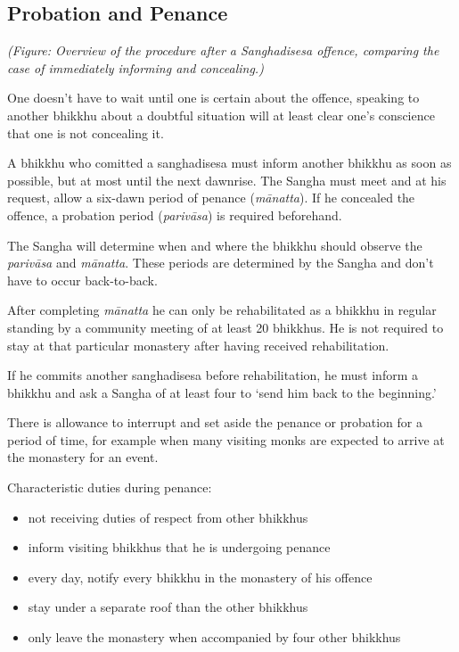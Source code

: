 \subsection{Probation and Penance}

\enlargethispage*{4\baselineskip}
\par
{}
\par
\clearpage

\emph{(Figure: Overview of the procedure after a Sanghadisesa offence,
comparing the case of immediately informing and concealing.)}

One doesn't have to wait until one is certain about the offence,
speaking to another bhikkhu about a doubtful situation will at least
clear one's conscience that one is not concealing it.

A bhikkhu who comitted a sanghadisesa must inform another bhikkhu as
soon as possible, but at most until the next dawnrise. The Sangha must
meet and at his request, allow a six-dawn period of penance
(\emph{mānatta}). If he concealed the offence, a probation period
(\emph{parivāsa}) is required beforehand.

The Sangha will determine when and where the bhikkhu should observe the
\emph{parivāsa} and \emph{mānatta}. These periods are determined by the
Sangha and don't have to occur back-to-back.

After completing \emph{mānatta} he can only be rehabilitated as a
bhikkhu in regular standing by a community meeting of at least 20
bhikkhus. He is not required to stay at that particular monastery after
having received rehabilitation.

If he commits another sanghadisesa before rehabilitation, he must inform
a bhikkhu and ask a Sangha of at least four to `send him back to the
beginning.'

There is allowance to interrupt and set aside the penance or probation
for a period of time, for example when many visiting monks are expected
to arrive at the monastery for an event.

Characteristic duties during penance:

\begin{itemize}
\tightlist
\item
  not receiving duties of respect from other bhikkhus
\item
  inform visiting bhikkhus that he is undergoing penance
\item
  every day, notify every bhikkhu in the monastery of his offence
\item
  stay under a separate roof than the other bhikkhus
\item
  only leave the monastery when accompanied by four other bhikkhus
\end{itemize}

